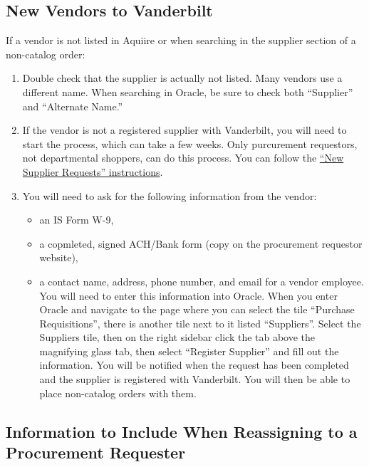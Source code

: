 \documentclass[
]{book}
\begin{document}
\hypertarget{new-vendors-to-vanderbilt}{%
\subsection{New Vendors to Vanderbilt}\label{new-vendors-to-vanderbilt}}

If a vendor is not listed in Aquiire or when searching in the supplier section of a non-catalog order:

\begin{enumerate}
\def\labelenumi{\arabic{enumi}.}
\item
  Double check that the supplier is actually not listed. Many vendors use a different name. When searching in Oracle, be sure to check both ``Supplier'' and ``Alternate Name.''
\item
  If the vendor is not a registered supplier with Vanderbilt, you will need to start the process, which can take a few weeks. Only purcurement requestors, not departmental shoppers, can do this process. You can follow the \href{https://www.vanderbilt.edu/skyvu/procurement-requesters.php}{``New Supplier Requests'' instructions}.
\item
  You will need to ask for the following information from the vendor:

  \begin{itemize}
  \item
    an IS Form W-9,
  \item
    a copmleted, signed ACH/Bank form (copy on the procurement requestor website),
  \item
    a contact name, address, phone number, and email for a vendor employee. You will need to enter this information into Oracle. When you enter Oracle and navigate to the page where you can select the tile ``Purchase Requisitions'', there is another tile next to it listed ``Suppliers''. Select the Suppliers tile, then on the right sidebar click the tab above the magnifying glass tab, then select ``Register Supplier'' and fill out the information. You will be notified when the request has been completed and the supplier is registered with Vanderbilt. You will then be able to place non-catalog orders with them.
  \end{itemize}
\end{enumerate}

\hypertarget{reassign}{%
\subsection{Information to Include When Reassigning to a Procurement Requester}\label{reassign}}
\end{document}
